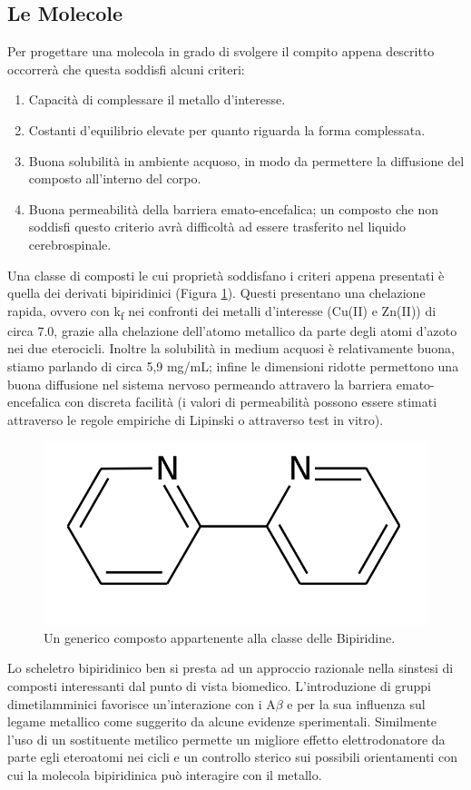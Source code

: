 \documentclass[a4paper, 12pt]{article}
\begin{document}
\subsection{Le Molecole}
\label{sec:bpy_mol}
Per progettare una molecola in grado di svolgere il compito appena descritto occorrerà che questa soddisfi alcuni criteri:
\begin{enumerate}
	\item Capacità di complessare il metallo d'interesse.
	\item Costanti d'equilibrio elevate per quanto riguarda la forma complessata.
	\item Buona solubilità in ambiente acquoso, in modo da permettere la diffusione del composto all'interno del corpo.
	\item Buona permeabilità della barriera emato-encefalica; un composto che non soddisfi questo criterio avrà difficoltà ad essere trasferito nel liquido cerebrospinale.
\end{enumerate}
Una classe di composti le cui proprietà soddisfano i criteri appena presentati è quella dei derivati bipiridinici (Figura \ref{fig:bpy}).
Questi presentano una chelazione rapida, ovvero con k\textsubscript{f} nei confronti dei metalli d'interesse (Cu(II) e Zn(II)) di circa 7.0, grazie alla chelazione dell'atomo metallico da parte degli atomi d'azoto nei due eterocicli. Inoltre la solubilità in medium acquosi è relativamente buona, stiamo parlando di circa 5,9 mg/mL; infine le dimensioni ridotte permettono una buona diffusione nel sistema nervoso permeando attravero la barriera emato-encefalica con discreta facilità (i valori di permeabilità possono essere stimati attraverso le regole empiriche di Lipinski o attraverso test in vitro\cite{di_high_2003}).
\begin{figure}[H]
	\centering
	\includegraphics[width=.3\linewidth]{immagini/bpy.png}
	\caption{Un generico composto appartenente alla classe delle Bipiridine.}
	\label{fig:bpy}
\end{figure}
Lo scheletro bipiridinico ben si presta ad un approccio razionale nella sinstesi di composti interessanti dal punto di vista biomedico.
L'introduzione di gruppi dimetilamminici favorisce un'interazione con i A$\beta$ e per la sua influenza sul legame metallico come suggerito da alcune evidenze sperimentali. Similmente l'uso di un sostituente metilico permette un migliore effetto elettrodonatore da parte egli eteroatomi nei cicli e un controllo sterico sui possibili orientamenti con cui la molecola bipiridinica può interagire con il metallo. \cite{derrick_importance_2016,savelieff_ongoing_2014}
\end{document}
